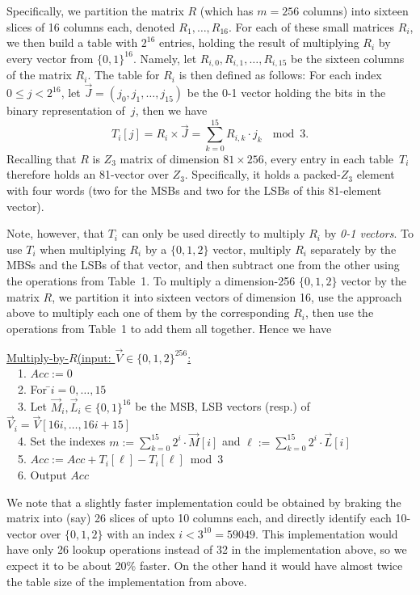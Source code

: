 Specifically, we partition the matrix $R$ (which has $m=256$ columns) into sixteen slices of 16 columns each, denoted $R_1,\ldots,R_{16}$.
For each of these small matrices $R_i$, we then build a table with $2^{16}$ entries, holding the result of multiplying $R_i$ by every vector from $\{0,1\}^{16}$.
Namely, let $R_{i,0},R_{i,1},\ldots,R_{i,15}$ be the sixteen columns of the matrix $R_i$.
The table for $R_i$ is then defined as follows: For each index $0\le j < 2^{16}$, let $\vec{J}=(j_0,j_1,\ldots,j_{15})$ be the 0-1 vector holding the bits in the binary representation of~$j$, then we have
\[
T_i[j] = R_i \times \vec{J} = \sum_{k=0}^{15} R_{i,k} \cdot j_k ~~\bmod 3.
\]
Recalling that $R$ is $Z_3$ matrix of dimension $81\times 256$, every entry in each table~$T_i$ therefore holds an 81-vector over $Z_3$.
Specifically, it holds a packed-$Z_3$ element with four words (two for the MSBs and two for the LSBs of this 81-element vector).

Note, however, that $T_i$ can only be used directly to multiply $R_i$ by \emph{0-1 vectors}.
To use $T_i$ when multiplying $R_i$ by a $\{0,1,2\}$ vector, multiply $R_i$ separately by the MBSs and the LSBs of that vector, and then subtract one from the other using the operations from Table~1.
To multiply a dimension-256 $\{0,1,2\}$ vector by the matrix $R$, we partition it into sixteen vectors of dimension 16, use the approach above to multiply each one of them by the corresponding $R_i$, then use the operations from Table~1 to add them all together.
Hence we have

\begin{tabbing}
	\underline{Multiply-by-$R$(input: $\vec{V}\in\{0,1,2\}^{256}$:}\\
	~~1. $Acc := 0$\\
	~~2. For \=$i=0,\ldots,15$\\
	~~3. \> Let $\vec{M}_i,\vec{L}_i\in\{0,1\}^{16}$ be the MSB, LSB vectors (resp.) of $\vec{V}_i=\vec{V}[16i,\ldots,16i+15]$\\
	~~4. \> Set the indexes $m:=\sum_{k=0}^{15}2^i\cdot\vec{M}[i]$
	and $\ell:=\sum_{k=0}^{15}2^i\cdot\vec{L}[i]$\\
	~~5. \> $Acc := Acc + T_i[\ell] - T_i[\ell] \bmod 3$\\
	~~6. Output $Acc$
\end{tabbing}

We note that a slightly faster implementation could be obtained by braking the matrix into (say) 26 slices of upto 10 columns each, and directly identify each 10-vector over $\{0,1,2\}$ with an index $i<3^{10}=59049$.
This implementation would have only 26 lookup operations instead of 32 in the implementation above, so we expect it to be about 20\% faster. On the other hand it would have almost twice the table size of the implementation from above.



